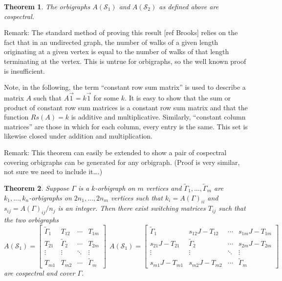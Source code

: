 \documentclass[12pt]{article}
\theoremstyle{plain}
\newtheorem{theorem}{Theorem}
\theoremstyle{definition}
\theoremstyle{remark}
\providecommand{\cover}[1]{\widetilde{#1}}
\begin{document}
  \begin{theorem}\label{thm:SeidelSwitchingSimple}
  The orbigraphs $A(\mathcal{S}_1)$ and $A(\mathcal{S}_2)$ as defined above are cospectral.
  \end{theorem}

  Remark: The standard method of proving this result [ref Brooks] relies on the fact that in an undirected graph, the number of walks of a given length originating at a given vertex is equal to the number of walks of that length terminating at the vertex. This is untrue for orbigraphs, so the well known proof is insufficient. %

  Note, in the following, the term ``constant row sum matrix'' is used to describe a matrix $A$ such that $A \vec{1} = k \vec{1}$ for some $k$. It is easy to show that the sum or product of constant row sum matrices is a constant row sum matrix and that the function $Rs(A) = k$ is additive and multiplicative. Similarly, ``constant column matrices'' are those in which for each column, every entry is the same. This set is likewise closed under addition and multiplication.

  

  Remark: This theorem can easily be extended to show a pair of cospectral covering orbigraphs can be generated for any orbigraph. (Proof is very similar, not sure we need to include it\ldots.)

  \begin{theorem}\label{thm:SeidelSwitchingExtension}
    Suppose $\Gamma$ is a $k$-orbigraph on $m$ vertices and $\cover{\Gamma}_1,\ldots,\cover{\Gamma}_m$ are $k_1,\ldots,k_n$-orbigraphs on $2n_1,\ldots,2n_m$ vertices such that $k_i = A(\Gamma)_{ii}$ and $s_{ij} = A(\Gamma)_{ij} / n_j$ is an integer. Then there exist switching matrices $T_{ij}$ such that the two orbigraphs 
    $$
    A(\mathcal{S}_1) = \begin{bmatrix}
      \cover{\Gamma}_1  & T_{12}            & \cdots & T_{1m} \\
      T_{21}            & \cover{\Gamma}_2  & \cdots & T_{2m} \\
      \vdots            & \vdots            & \ddots & \vdots \\
      T_{m1}            & T_{m2}            & \cdots & \cover{\Gamma}_m
    \end{bmatrix} \ \ 
    A(\mathcal{S}_1) = \begin{bmatrix}
      \cover{\Gamma}_1  & s_{12}J - T_{12}  & \cdots & s_{1m}J - T_{1m} \\
      s_{21}J - T_{21}  & \cover{\Gamma}_2  & \cdots & s_{2m}J - T_{2m} \\
      \vdots            & \vdots            & \ddots & \vdots \\
      s_{m1}J - T_{m1}  & s_{m2}J - T_{m2}  & \cdots & \cover{\Gamma}_m
    \end{bmatrix}
    $$
    are cospectral and cover $\Gamma$.
  \end{theorem}
\end{document}
